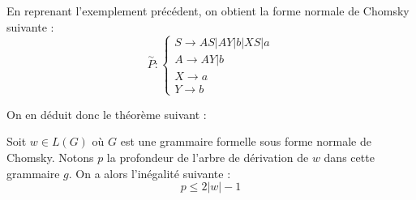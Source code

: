 \begin{example}
    En reprenant l'exemplement précédent, on obtient la forme normale de Chomsky suivante : 
    \[ \overset{\sim}{P} : 
        \begin{cases}
            S \longrightarrow AS | AY | b | XS | a \\ 
            A \longrightarrow AY | b \\ 
            X \longrightarrow a \\ 
            Y \longrightarrow b 
        \end{cases} \] 
\end{example}

On en déduit donc le théorème suivant :

\begin{theorem}
    Soit $w \in L(G)$ où $G$ est une grammaire formelle sous forme normale de Chomsky. 
    Notons $p$ la profondeur de l'arbre de dérivation de $w$ dans cette grammaire $g$. 
    On a alors l'inégalité suivante : 
        \[ \boxed{p \leqslant 2 |w| -1 } \] 
\end{theorem}




